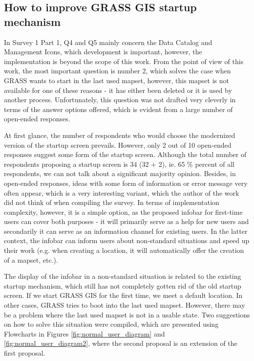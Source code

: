 \documentclass[a4paper,10pt,twoside]{article}
\begin{document}
\subsection{How to improve GRASS GIS startup mechanism}
\label{sec:proposal2}

In Survey 1 Part 1, Q4 and Q5 mainly concern the
Data Catalog and Management Icons, which development is important,
however, the implementation is beyond the scope of this work. From the
point of view of this work, the most important question is number 2,
which solves the case when GRASS wants to start in the last used
mapset, however, this mapset is not available for one of these reasons
- it has either been deleted or it is used by another
process. Unfortunately, this question was not drafted very cleverly in
terms of the answer options offered, which is evident from a large
number of open-ended responses.

At first glance, the number of respondents who would choose the
modernized version of the startup screen prevails. However, only 2 out
of 10 open-ended responses suggest some form of the startup
screen. Although the total number of respondents proposing a startup
screen is 34 (32 + 2), ie. 65 \% percent of all respondents, we can
not talk about a significant majority opinion. Besides, in open-ended
responses, ideas with some form of information or error message very
often appear, which is a very interesting variant, which the author of
the work did not think of when compiling the survey. In terms of
implementation complexity, however, it is a simple option, as the
proposed infobar for first-time users can cover both purposes - it
will primarily serve as a help for new users and secondarily it can
serve as an information channel for existing users. In the latter
context, the infobar can inform users about non-standard situations
and speed up their work (e.g. when creating a location, it will
automatically offer the creation of a mapset, etc.).

The display of the infobar in a non-standard situation is related to
the existing startup mechanism, which still has not completely gotten
rid of the old startup screen. If we start GRASS GIS for the first
time, we meet a default location. In other cases, GRASS tries to boot
into the last used mapset. However, there may be a problem where the
last used mapset is not in a usable state. Two suggestions on how to
solve this situation were compiled, which are presented using
Flowcharts in Figures \ref{fig:normal_user_diagram} and
\ref{fig:normal_user_diagram2}, where the second proposal is an
extension of the first proposal.
\end{document}
